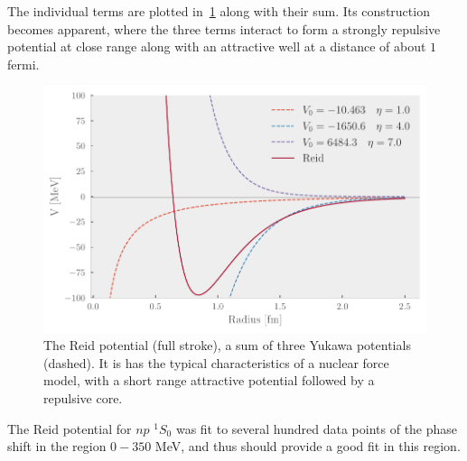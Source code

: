 The individual terms are plotted in~\cref{fig:reid} along with their sum. Its
construction becomes apparent, where the three terms interact to form a strongly
repulsive potential at close range along with an attractive well at a distance
of about \(1\) fermi.

\begin{figure}[ht]
  \centering
  \includegraphics[]{Figures/reid.pdf}
  \caption{\label{fig:reid} The Reid potential (full stroke), a sum of three Yukawa potentials
  (dashed). It is has the typical characteristics of a nuclear force model, with
  a short range attractive potential followed by a repulsive core.}
\end{figure}

The Reid potential for \(np\) \(^{1}S_{0}\) was fit to several hundred data points
of the phase shift in the region \(0-350\) MeV, and thus should provide a good
fit in this region\cite{reid}.





